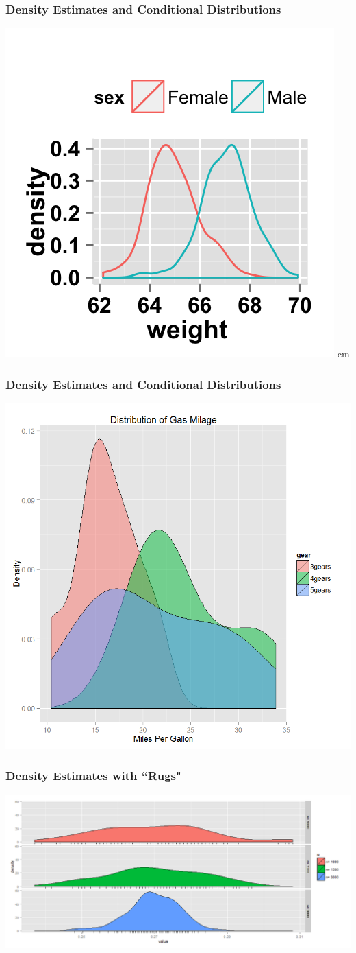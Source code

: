 \documentclass{beamer} %
\begin{document}
\begin{frame}\frametitle{Density Estimates and Conditional Distributions}
	\includegraphics[width=0.66\linewidth]{density2.png} \hfill
	 cm
\end{frame}




\begin{frame}\frametitle{Density Estimates and Conditional Distributions}

	\includegraphics[width=0.71\linewidth]{density.png}
\end{frame}





\begin{frame}\frametitle{Density Estimates with ``Rugs"}
	\centering
	\includegraphics[width=\linewidth]{rug.png}
\end{frame}
\end{document}
